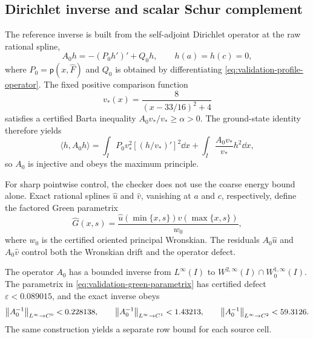 \subsection{Dirichlet inverse and scalar Schur complement}

The reference inverse is built from the self-adjoint Dirichlet operator at the
raw rational spline,
\begin{equation}
 A_0h=-(P_0h')'+Q_0h,\qquad h(a)=h(c)=0,
 \label{eq:validation-jacobi}
\end{equation}
where $P_0=\mathsf p(x,\widehat F)$ and $Q_0$ is obtained by differentiating
\eqref{eq:validation-profile-operator}.  The fixed positive comparison
function
\[
 v_*(x)=\frac{8}{(x-33/16)^2+4}
\]
satisfies a certified Barta inequality $A_0v_*/v_*\geq\alpha>0$.  The
ground-state identity therefore yields
\begin{equation}
 \langle h,A_0h\rangle
 =\int_I P_0v_*^2\left[(h/v_*)'\right]^2\dd x
  +\int_I\frac{A_0v_*}{v_*}h^2\dd x,
 \label{eq:validation-ground-state}
\end{equation}
so $A_0$ is injective and obeys the maximum principle.

For sharp pointwise control, the checker does not use the coarse energy bound
alone.  Exact rational splines $\widehat u$ and $\widehat v$, vanishing at $a$
and $c$, respectively, define the factored Green parametrix
\begin{equation}
 \widehat G(x,s)=
 \frac{\widehat u(\min\{x,s\})\widehat v(\max\{x,s\})}{w_0},
 \label{eq:validation-green-parametrix}
\end{equation}
where $w_0$ is the certified oriented principal Wronskian.  The residuals
$A_0\widehat u$ and $A_0\widehat v$ control both the Wronskian drift and the
operator defect.

\begin{lemma}
\label{lem:validation-green-resolvent}
The operator $A_0$ has a bounded inverse from $L^\infty(I)$ to
$W^{2,\infty}(I)\cap W^{1,\infty}_0(I)$.  The parametrix in
\eqref{eq:validation-green-parametrix} has certified defect
\(
 \varepsilon<0.089015
\), and the exact inverse obeys
\begin{equation}
 \left\lVert A_0^{-1}\right\rVert_{L^\infty\to C^0}<0.228138,\qquad
 \left\lVert A_0^{-1}\right\rVert_{L^\infty\to C^1}<1.43213,\qquad
 \left\lVert A_0^{-1}\right\rVert_{L^\infty\to C^2}<59.3126.
 \label{eq:validation-green-bounds}
\end{equation}
The same construction yields a separate row bound for each source cell.
\end{lemma}

